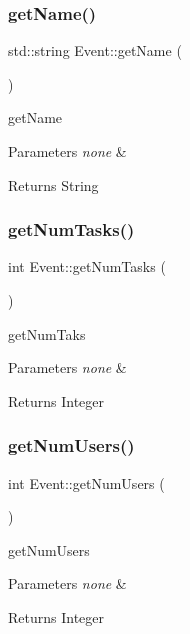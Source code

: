 \subsubsection{\texorpdfstring{get\+Name()}{getName()}}
{\footnotesize\ttfamily std\+::string Event\+::get\+Name (\begin{DoxyParamCaption}{ }\end{DoxyParamCaption})}

get\+Name 
\begin{DoxyParams}{Parameters}
{\em none} & \\
\hline
\end{DoxyParams}
\begin{DoxyReturn}{Returns}
String 
\end{DoxyReturn}
\mbox{\label{class_event_a3e2c6782aa72b2c0663a499d23c57f12}} 
\subsubsection{\texorpdfstring{get\+Num\+Tasks()}{getNumTasks()}}
{\footnotesize\ttfamily int Event\+::get\+Num\+Tasks (\begin{DoxyParamCaption}{ }\end{DoxyParamCaption})}

get\+Num\+Taks 
\begin{DoxyParams}{Parameters}
{\em none} & \\
\hline
\end{DoxyParams}
\begin{DoxyReturn}{Returns}
Integer 
\end{DoxyReturn}
\mbox{\label{class_event_a4b5a29e8ea8ff1199e31cf7d3cf1301b}} 
\subsubsection{\texorpdfstring{get\+Num\+Users()}{getNumUsers()}}
{\footnotesize\ttfamily int Event\+::get\+Num\+Users (\begin{DoxyParamCaption}{ }\end{DoxyParamCaption})}

get\+Num\+Users 
\begin{DoxyParams}{Parameters}
{\em none} & \\
\hline
\end{DoxyParams}
\begin{DoxyReturn}{Returns}
Integer 
\end{DoxyReturn}
\mbox{\label{class_event_a91a803183d3ab50bc824c445ef0824b5}} 
